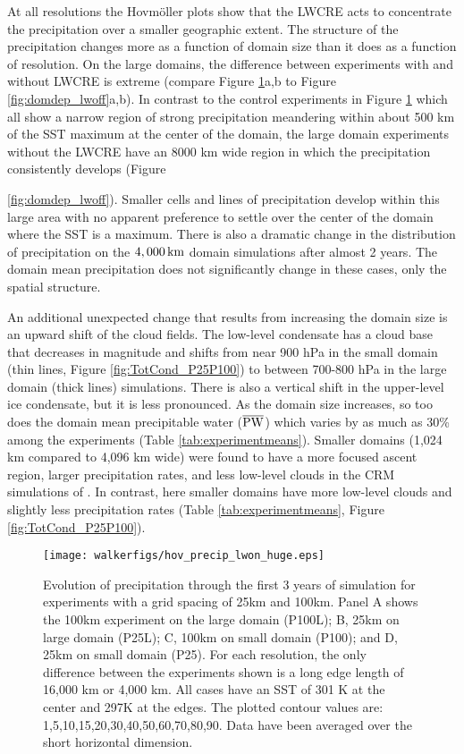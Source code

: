 \documentclass[draft]{agujournal2019}
\begin{document}
At all resolutions the Hovm{\"o}ller plots show that the LWCRE acts to concentrate the precipitation over a smaller geographic extent.   
The structure of the precipitation changes more 
as a function of domain size than it does as a function of resolution. 
On the large domains, the difference between experiments with and without LWCRE is extreme (compare Figure \ref{fig:domdep}a,b to Figure \ref{fig:domdep_lwoff}a,b).  
In contrast to the control experiments in Figure \ref{fig:domdep} which all show a narrow region of strong 
precipitation meandering within about 500 km of the SST maximum at the center of the domain,  the large domain experiments 
without the LWCRE have an 8000 km wide region in which the precipitation consistently develops (Figure {\ref{fig:domdep_lwoff}).  
Smaller cells and lines of precipitation develop within this large area with no apparent preference to settle
over the center of the domain where the SST is a maximum.  
There is also a dramatic change in the distribution of precipitation on the $4,000\, \rm{km}$ domain simulations after almost 2 years.   
The domain mean precipitation does not significantly change in these cases, only the spatial structure. 

An additional unexpected change that results from increasing the domain size is an upward shift of the cloud fields.  
The low-level condensate has a cloud base that decreases in magnitude and shifts from  near 900 hPa in the small domain (thin lines, Figure \ref{fig:TotCond_P25P100}) to between 700-800 hPa in 
the large domain (thick lines) simulations.
There is also a vertical shift in the upper-level ice condensate, but it is less pronounced.  
As the domain size increases, so too does the domain mean precipitable water ($\overline{\rm{PW}}$) which varies by as much as 30\% among the experiments (Table \ref{tab:experimentmeans}).   
Smaller domains (1,024 km compared to 4,096 km wide) were found to have a more focused ascent region, larger precipitation rates, and less low-level clouds in the CRM simulations of .
In contrast, here smaller domains have more low-level clouds and slightly less precipitation rates (Table \ref{tab:experimentmeans}, 
Figure \ref{fig:TotCond_P25P100}).     


\begin{figure}
   \texttt{[image: walkerfigs/hov\_precip\_lwon\_huge.eps]}
  \caption{Evolution of precipitation through the first 3 years of simulation for experiments with a grid spacing of
  25km and 100km.  Panel A shows the 100km experiment on the large domain (P100L); 
  B, 25km on large domain (P25L); C, 100km on small domain (P100); and D, 25km on small domain 
  (P25).  For each resolution, the only difference between the experiments shown is a long edge length of 
  16,000 km or 4,000 km.  All cases have an SST of 301 K at the center and 297K at the edges.  
  The plotted contour values are: 1,5,10,15,20,30,40,50,60,70,80,90.  Data have been averaged over the short horizontal dimension.}
  \label{fig:domdep}
\end{figure}

}
\end{document}
